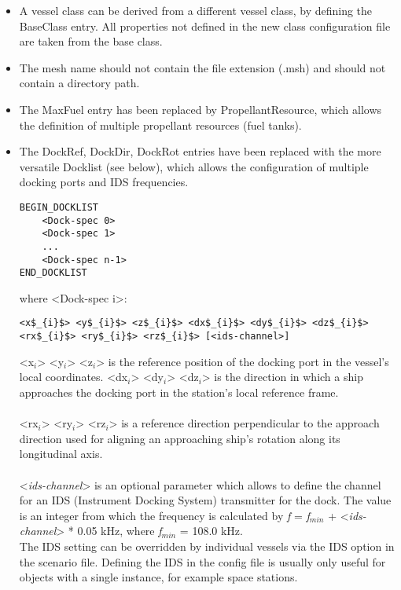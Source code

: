 \documentclass[Orbiter Developer Manual.tex]{subfiles}
\begin{document}
\begin{itemize}
\item A vessel class can be derived from a different vessel class, by defining the BaseClass entry. All properties not defined in the new class configuration file are taken from the base class.
\item The mesh name should not contain the file extension (.msh) and should not contain a directory path.
\item The MaxFuel entry has been replaced by PropellantResource, which allows the definition of multiple propellant resources (fuel tanks).
\item The DockRef, DockDir, DockRot entries have been replaced with the more versatile Docklist (see below), which allows the configuration of multiple docking ports and IDS frequencies.

\begin{lstlisting}[language=OSFS]
BEGIN_DOCKLIST
	<Dock-spec 0>
	<Dock-spec 1>
	...
	<Dock-spec n-1>
END_DOCKLIST
\end{lstlisting}

\noindent
where <Dock-spec i>:

\begin{lstlisting}[language=OSFS,mathescape=true]
<x$_{i}$> <y$_{i}$> <z$_{i}$> <dx$_{i}$> <dy$_{i}$> <dz$_{i}$> <rx$_{i}$> <ry$_{i}$> <rz$_{i}$> [<ids-channel>]
\end{lstlisting}

\noindent
<x$_{i}$> <y$_{i}$> <z$_{i}$> is the reference position of the docking port in the vessel’s local coordinates. <dx$_{i}$> <dy$_{i}$> <dz$_{i}$> is the direction in which a ship approaches the docking port in the station’s local reference frame.\\
\\
<rx$_{i}$> <ry$_{i}$> <rz$_{i}$> is a reference direction perpendicular to the approach direction used for aligning an approaching ship’s rotation along its longitudinal axis.\\
\\
<\textit{ids-channel}> is an optional parameter which allows to define the channel for an IDS (Instrument Docking System) transmitter for the dock. The value is an integer from which the frequency is calculated by \textit{f} = \textit{f}$_{min}$ + <\textit{ids-channel}> * 0.05 kHz, where \textit{f}$_{min}$ = 108.0 kHz.\\
The IDS setting can be overridden by individual vessels via the IDS option in the scenario file. Defining the IDS in the config file is usually only useful for objects with a single instance, for example space stations.


\end{itemize}
\end{document}
